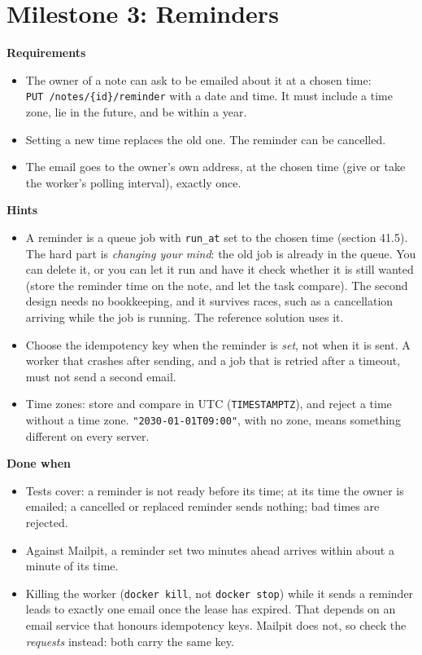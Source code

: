 \setcounter{section}{3}
\section{Milestone 3: Reminders}\label{44-project-notes-for-many-users:444-milestone-3-reminders}

\textbf{Requirements}

\begin{itemize}
\tightlist
\item
  The owner of a note can ask to be emailed about it at a chosen time: \texttt{PUT\ /}\allowbreak{}\texttt{notes/}\allowbreak{}\texttt{\{id\}/}\allowbreak{}\texttt{reminder} with a date and time. It must include a time zone, lie in the future, and be within a year.
\item
  Setting a new time replaces the old one. The reminder can be cancelled.
\item
  The email goes to the owner's own address, at the chosen time (give or take the worker's polling interval), exactly once.
\end{itemize}

\noindent{}\textbf{Hints}

\begin{itemize}
\tightlist
\item
  A reminder is a queue job with \texttt{run\_at} set to the chosen time (section 41.5). The hard part is \emph{changing your mind}: the old job is already in the queue. You can delete it, or you can let it run and have it check whether it is still wanted (store the reminder time on the note, and let the task compare). The second design needs no bookkeeping, and it survives races, such as a cancellation arriving while the job is running. The reference solution uses it.
\item
  Choose the idempotency key when the reminder is \emph{set}, not when it is sent. A worker that crashes after sending, and a job that is retried after a timeout, must not send a second email.
\item
  Time zones: store and compare in UTC (\texttt{TIMESTAMPTZ}), and reject a time without a time zone. \texttt{"2030-01-01T09:00"}, with no zone, means something different on every server.
\end{itemize}

\noindent{}\textbf{Done when}

\begin{itemize}
\item[$\square$]
  Tests cover: a reminder is not ready before its time; at its time the owner is emailed; a cancelled or replaced reminder sends nothing; bad times are rejected.
\item[$\square$]
  Against Mailpit, a reminder set two minutes ahead arrives within about a minute of its time.
\item[$\square$]
  Killing the worker (\texttt{docker\ kill}, not \texttt{docker\ stop}) while it sends a reminder leads to exactly one email once the lease has expired. That depends on an email service that honours idempotency keys. Mailpit does not, so check the \emph{requests} instead: both carry the same key.
\end{itemize}

